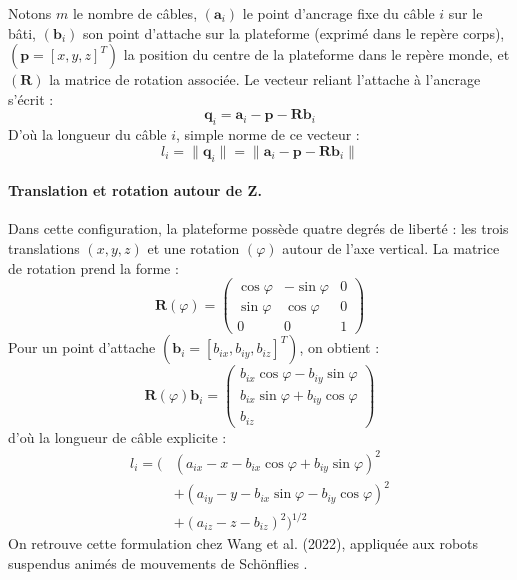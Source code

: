 Notons $m$ le nombre de câbles, $(\mathbf{a}_i)$ le point d'ancrage fixe du câble $i$ sur le bâti, $(\mathbf{b}_i)$ son point d'attache sur la plateforme (exprimé dans le repère corps), $(\mathbf{p} = [x,y,z]^T)$ la position du centre de la plateforme dans le repère monde, et $(\mathbf{R})$ la matrice de rotation associée. Le vecteur reliant l'attache à l'ancrage s'écrit :
\begin{equation}
\mathbf{q}_i = \mathbf{a}_i - \mathbf{p} - \mathbf{R}\mathbf{b}_i
\label{eq:qi}
\end{equation}
D'où la longueur du câble $i$, simple norme de ce vecteur :
\begin{equation}
l_i = \|\mathbf{q}_i\| = \|\mathbf{a}_i - \mathbf{p} - \mathbf{R}\mathbf{b}_i\|
\label{eq:li}
\end{equation}

\paragraph{Translation et rotation autour de Z.}
Dans cette configuration, la plateforme possède quatre degrés de liberté : les trois translations $(x, y, z)$ et une rotation $(\varphi)$ autour de l'axe vertical. La matrice de rotation prend la forme :
\begin{equation}
\mathbf{R}(\varphi) = \begin{pmatrix}
\cos\varphi & -\sin\varphi & 0 \\
\sin\varphi & \cos\varphi & 0 \\
0 & 0 & 1
\end{pmatrix}
\label{eq:Rphi}
\end{equation}
Pour un point d'attache $(\mathbf{b}_i = [b_{ix}, b_{iy}, b_{iz}]^T)$, on obtient :
\begin{equation}
\mathbf{R}(\varphi)\mathbf{b}_i = \begin{pmatrix}
b_{ix}\cos\varphi - b_{iy}\sin\varphi \\
b_{ix}\sin\varphi + b_{iy}\cos\varphi \\
b_{iz}
\end{pmatrix}
\end{equation}
d'où la longueur de câble explicite :
\begin{equation}
\begin{aligned}
l_i = \Big( &(a_{ix}-x-b_{ix}\cos\varphi+b_{iy}\sin\varphi)^2 \\
&+ (a_{iy}-y-b_{ix}\sin\varphi-b_{iy}\cos\varphi)^2 \\
&+ (a_{iz}-z-b_{iz})^2 \Big)^{1/2}
\end{aligned}
\label{eq:li_schoenflies}
\end{equation}
On retrouve cette formulation chez Wang et al. (2022), appliquée aux robots suspendus animés de mouvements de Schönflies \cite{mdpi2022}.


